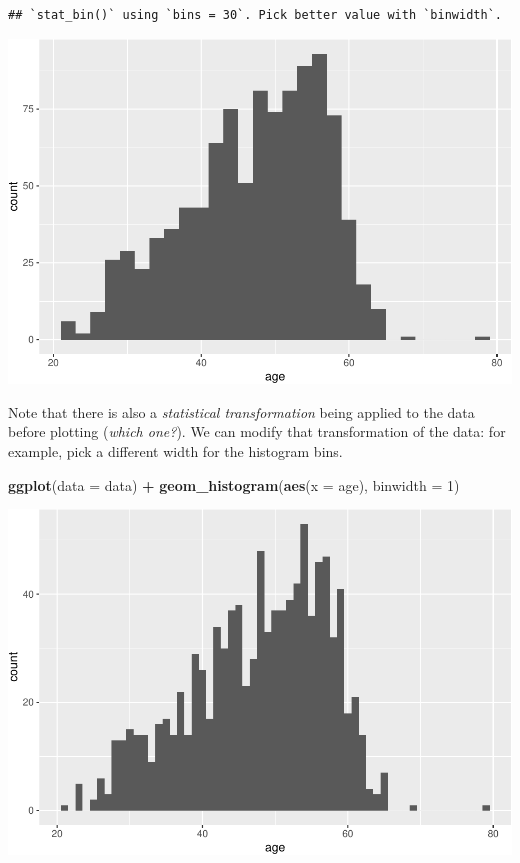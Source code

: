 \documentclass[
]{book}
\newenvironment{Shaded}{\begin{snugshade}}{\end{snugshade}}
\newcommand{\AttributeTok}[1]{\textcolor[rgb]{0.13,0.29,0.53}{#1}}
\newcommand{\DecValTok}[1]{\textcolor[rgb]{0.00,0.00,0.81}{#1}}
\newcommand{\FunctionTok}[1]{\textcolor[rgb]{0.13,0.29,0.53}{\textbf{#1}}}
\newcommand{\NormalTok}[1]{#1}
\newcommand{\SpecialCharTok}[1]{\textcolor[rgb]{0.81,0.36,0.00}{\textbf{#1}}}
\begin{document}
\begin{verbatim}
## `stat_bin()` using `bins = 30`. Pick better value with `binwidth`.
\end{verbatim}

\includegraphics{R-for-social-research-and-business-analytics_files/figure-latex/unnamed-chunk-17-1.pdf}

Note that there is also a \emph{statistical transformation} being applied to the data before plotting (\emph{which one?}). We can modify that transformation of the data: for example, pick a different width for the histogram bins.

\begin{Shaded}
\begin{Highlighting}[]
\FunctionTok{ggplot}\NormalTok{(}\AttributeTok{data =}\NormalTok{ data) }\SpecialCharTok{+}
  \FunctionTok{geom\_histogram}\NormalTok{(}\FunctionTok{aes}\NormalTok{(}\AttributeTok{x =}\NormalTok{ age), }\AttributeTok{binwidth =} \DecValTok{1}\NormalTok{)}
\end{Highlighting}
\end{Shaded}

\includegraphics{R-for-social-research-and-business-analytics_files/figure-latex/unnamed-chunk-18-1.pdf}
\end{document}
